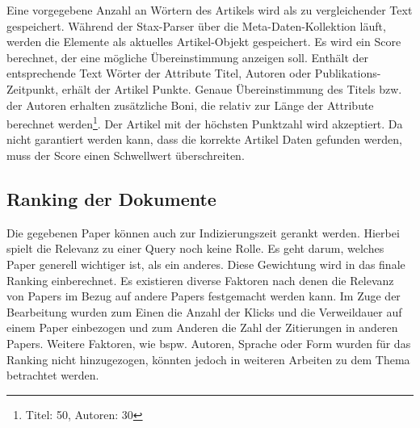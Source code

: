 Eine vorgegebene Anzahl an Wörtern des Artikels wird als zu
vergleichender Text gespeichert. Während der Stax-Parser über die
Meta-Daten-Kollektion läuft, werden die Elemente als aktuelles 
Artikel-Objekt gespeichert. Es wird ein Score berechnet, der eine
mögliche Übereinstimmung anzeigen soll. Enthält der entsprechende Text Wörter der
Attribute Titel, Autoren oder Publikations-Zeitpunkt, erhält der Artikel Punkte. Genaue Übereinstimmung des
Titels bzw. der Autoren erhalten zusätzliche Boni, die relativ zur
Länge der Attribute berechnet werden\footnote{Titel: 50, Autoren:
  30}. Der Artikel mit der höchsten Punktzahl wird akzeptiert. Da
nicht garantiert werden kann, dass die korrekte Artikel Daten gefunden
werden, muss der Score einen Schwellwert überschreiten.

\subsection{Ranking der Dokumente}\label{sec:ranking}


Die gegebenen Paper können auch zur Indizierungszeit gerankt werden. Hierbei spielt die Relevanz zu einer Query noch keine Rolle. Es geht darum, welches Paper generell wichtiger ist, als ein anderes. Diese Gewichtung wird in das finale Ranking einberechnet.
Es existieren diverse Faktoren nach denen die Relevanz von Papers im Bezug auf andere Papers festgemacht werden kann. Im Zuge der Bearbeitung wurden zum Einen die Anzahl der Klicks und die Verweildauer auf einem Paper einbezogen und zum Anderen die Zahl der Zitierungen in anderen Papers. Weitere Faktoren, wie bspw. Autoren, Sprache oder Form wurden für das Ranking nicht hinzugezogen, könnten jedoch in weiteren Arbeiten zu dem Thema betrachtet werden.  \\

